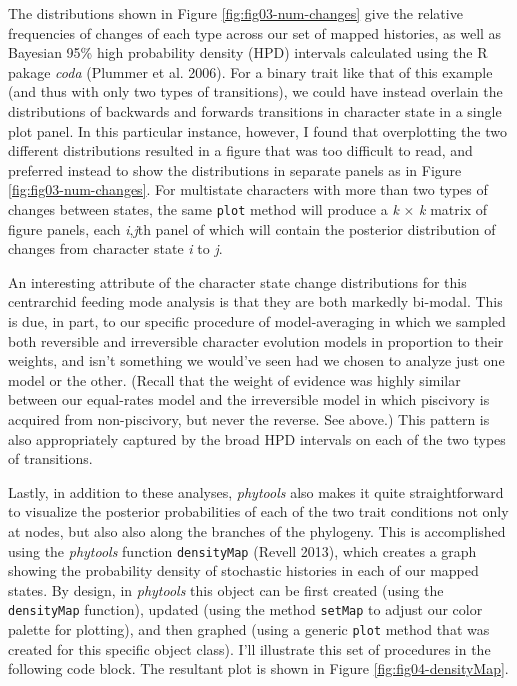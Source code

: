 \documentclass[fleqn,10pt,lineno]{wlpeerj} %
\begin{document}
The distributions shown in Figure \ref{fig:fig03-num-changes} give the relative frequencies of changes of each type across our set of mapped histories, as well as Bayesian 95\% high probability density (HPD) intervals calculated using the R pakage \emph{coda} (Plummer et al. 2006). For a binary trait like that of this example (and thus with only two types of transitions), we could have instead overlain the distributions of backwards and forwards transitions in character state in a single plot panel. In this particular instance, however, I found that overplotting the two different distributions resulted in a figure that was too difficult to read, and preferred instead to show the distributions in separate panels as in Figure \ref{fig:fig03-num-changes}. For multistate characters with more than two types of changes between states, the same \texttt{plot} method will produce a \emph{k} \(\times\) \emph{k} matrix of figure panels, each \emph{i},\emph{j}th panel of which will contain the posterior distribution of changes from character state \emph{i} to \emph{j}.

An interesting attribute of the character state change distributions for this centrarchid feeding mode analysis is that they are both markedly bi-modal. This is due, in part, to our specific procedure of model-averaging in which we sampled both reversible and irreversible character evolution models in proportion to their weights, and isn't something we would've seen had we chosen to analyze just one model or the other. (Recall that the weight of evidence was highly similar between our equal-rates model and the irreversible model in which piscivory is acquired from non-piscivory, but never the reverse. See above.) This pattern is also appropriately captured by the broad HPD intervals on each of the two types of transitions.

Lastly, in addition to these analyses, \emph{phytools} also makes it quite straightforward to visualize the posterior probabilities of each of the two trait conditions not only at nodes, but also also along the branches of the phylogeny. This is accomplished using the \emph{phytools} function \texttt{densityMap} (Revell 2013), which creates a graph showing the probability density of stochastic histories in each of our mapped states. By design, in \emph{phytools} this object can be first created (using the \texttt{densityMap} function), updated (using the method \texttt{setMap} to adjust our color palette for plotting), and then graphed (using a generic \texttt{plot} method that was created for this specific object class). I'll illustrate this set of procedures in the following code block. The resultant plot is shown in Figure \ref{fig:fig04-densityMap}.
\end{document}
